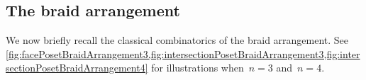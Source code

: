 \documentclass{amsart}
\theoremstyle{definition}
\begin{document}

\subsection{The braid arrangement}
\label{subsec:braidArrangement}

We now briefly recall the classical combinatorics of the braid arrangement.
See \cref{fig:facePosetBraidArrangement3,fig:intersectionPosetBraidArrangement3,fig:intersectionPosetBraidArrangement4} for illustrations when~$n = 3$ and~$n = 4$.


\end{document}
